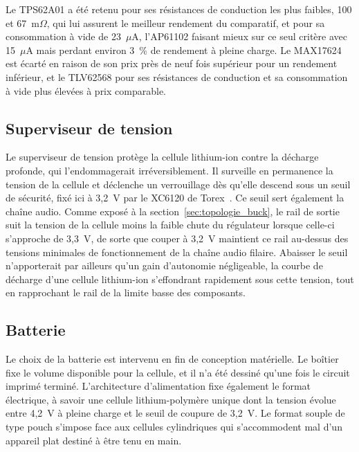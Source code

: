 Le TPS62A01 a été retenu pour ses résistances de conduction les plus faibles, 100 et 67~m$\Omega$, qui lui assurent le meilleur rendement du comparatif, et pour sa consommation à vide de 23~$\mu$A, l'AP61102 faisant mieux sur ce seul critère avec 15~$\mu$A mais perdant environ 3~\% de rendement à pleine charge. Le MAX17624 est écarté en raison de son prix près de neuf fois supérieur pour un rendement inférieur, et le TLV62568 pour ses résistances de conduction et sa consommation à vide plus élevées à prix comparable.






\subsection{Superviseur de tension}
\label{sec:superviseur}

Le superviseur de tension protège la cellule lithium-ion contre la décharge profonde, qui l'endommagerait irréversiblement. Il surveille en permanence la tension de la cellule et déclenche un verrouillage dès qu'elle descend sous un seuil de sécurité, fixé ici à 3,2~V par le XC6120 de Torex~\cite{torex_XC6120}. Ce seuil sert également la chaîne audio. Comme exposé à la section~\ref{sec:topologie_buck}, le rail de sortie suit la tension de la cellule moins la faible chute du régulateur lorsque celle-ci s'approche de 3,3~V, de sorte que couper à 3,2~V maintient ce rail au-dessus des tensions minimales de fonctionnement de la chaîne audio filaire. Abaisser le seuil n'apporterait par ailleurs qu'un gain d'autonomie négligeable, la courbe de décharge d'une cellule lithium-ion s'effondrant rapidement sous cette tension, tout en rapprochant le rail de la limite basse des composants.






\subsection{Batterie}
\label{sec:batterie}

Le choix de la batterie est intervenu en fin de conception matérielle. Le boîtier fixe le volume disponible pour la cellule, et il n'a été dessiné qu'une fois le circuit imprimé terminé. L'architecture d'alimentation fixe également le format électrique, à savoir une cellule lithium-polymère unique dont la tension évolue entre 4,2~V à pleine charge et le seuil de coupure de 3,2~V. Le format souple de type pouch s'impose face aux cellules cylindriques qui s'accommodent mal d'un appareil plat destiné à être tenu en main.

